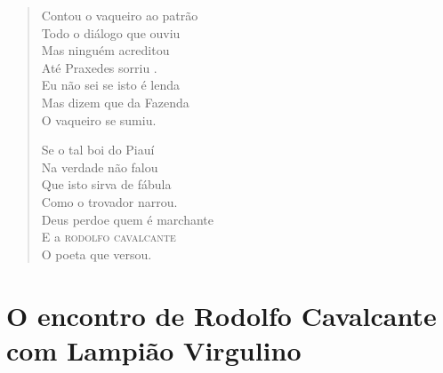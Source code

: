 \begin{verse}
Contou o vaqueiro ao patrão \\
Todo o diálogo que ouviu \\
Mas ninguém acreditou \\
Até Praxedes sorriu . \\
Eu não sei se isto é lenda \\
Mas dizem que da Fazenda \\
O vaqueiro se sumiu. 
\pagebreak

Se o tal boi do Piauí\\
Na verdade não falou \\
Que isto sirva de fábula \\
Como o trovador narrou. \\
Deus perdoe quem é marchante \\
E a \textsc{rodolfo cavalcante} \\
O poeta que versou. 
\end{verse}

\chapter{O encontro de Rodolfo Cavalcante com Lampião Virgulino }


